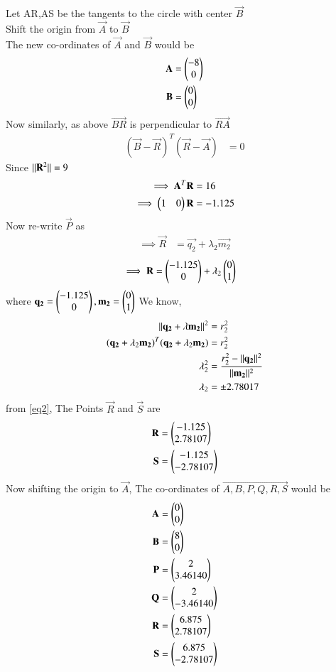 \documentclass[journal,12pt,twocolumn]{IEEEtran}
\begin{document}
Let AR,AS be the tangents to the circle with center $\vec{B}$\\
Shift the origin from $\vec{A}$ to $\vec{B}$\\
The new co-ordinates of $\vec{A}$ and $\vec{B}$ would be
\begin{align}
    \mathbf{A}&=\begin{pmatrix}-8\\0\end{pmatrix}\\
    \mathbf{B}&=\begin{pmatrix}0\\0\end{pmatrix}
\end{align}
Now similarly, as above $\vec{BR}$ is perpendicular to $\vec{RA}$
\begin{align}
    (\vec{B}-\vec{R})^T (\vec{R}-\vec{A}) &= 0
\end{align}
Since $\lVert\mathbf{R}^2\rVert=9$
\begin{align}
    \implies \mathbf{A}^T \mathbf{R} &= 16\\
    \implies \begin{pmatrix}1&0\end{pmatrix} \mathbf{R} &= -1.125
\end{align}
Now re-write $\vec{P}$ as
\begin{align}
    \implies \Vec{R} &=\vec{q_2}+\lambda_2\vec{m_2}
\end{align}
\begin{align}
    \implies \mathbf{R} &= \begin{pmatrix}-1.125\\0\end{pmatrix} + \lambda_2 \begin{pmatrix}0\\1\end{pmatrix} \label{eq2}
\end{align}
where $\mathbf{q_2}=\begin{pmatrix}-1.125\\ 0\end{pmatrix},\mathbf{m_2}=\begin{pmatrix}0\\1\end{pmatrix}$
We know,
\begin{align}
    \lVert\mathbf{q_2}+\lambda\mathbf{m_2}\rVert^2&=r_2^2\\
    (\mathbf{q_2}+\lambda_2 \mathbf{m_2})^T(\mathbf{q_2}+\lambda_2 \mathbf{m_2})&=r_2^2\\
    \lambda_2^2&=\frac{r_2^2-\lVert\mathbf{q_2}\rVert^2}{\lVert\mathbf{m_2}\rVert^2}\\
    \lambda_2 &= \pm 2.78017
\end{align}
from \eqref{eq2}, The Points $\vec{R}$ and $\vec{S}$ are
\begin{align}
    \mathbf{R}&=\begin{pmatrix}-1.125\\2.78107\end{pmatrix}\\
    \mathbf{S}&=\begin{pmatrix}-1.125\\-2.78107\end{pmatrix}
\end{align}
Now shifting the origin to $\vec{A}$, The co-ordinates of $\vec{A,B,P,Q,R,S}$ would be
\begin{align}
    \mathbf{A}&=\begin{pmatrix}0\\0\end{pmatrix}\\
    \mathbf{B}&=\begin{pmatrix}8\\0\end{pmatrix}\\
    \mathbf{P}&=\begin{pmatrix}2\\3.46140\end{pmatrix}\\
    \mathbf{Q}&=\begin{pmatrix}2\\-3.46140\end{pmatrix}\\
    \mathbf{R}&=\begin{pmatrix}6.875\\2.78107\end{pmatrix}\\
    \mathbf{S}&=\begin{pmatrix}6.875\\-2.78107\end{pmatrix}
\end{align}
\end{document}

